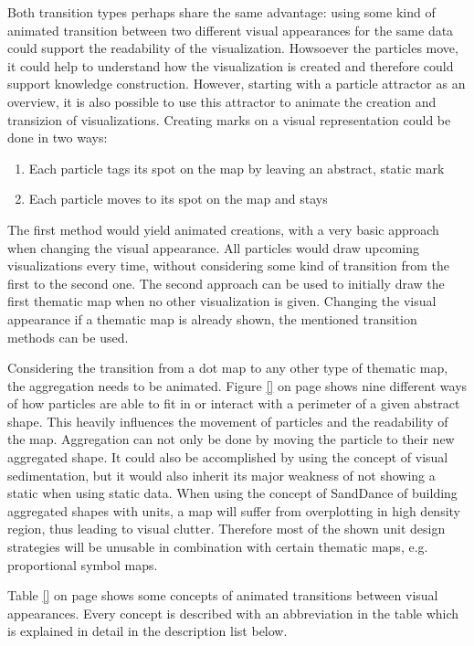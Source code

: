 Both transition types perhaps share the same advantage: using some kind of animated transition between two different visual appearances for the same data could support the readability of the visualization. Howsoever the particles move, it could help to understand how the visualization is created and therefore could support knowledge construction.
However, starting with a particle attractor as an overview, it is also possible to use this attractor to animate the creation and transizion of visualizations. Creating marks on a visual representation could be done in two ways:

\begin{enumerate}
\item Each particle tags its spot on the map by leaving an abstract, static mark
\item Each particle moves to its spot on the map and stays
\end{enumerate}

The first method would yield animated creations, with a very basic approach when changing the visual appearance. All particles would draw upcoming visualizations every time, without considering some kind of transition from the first to the second one. The second approach can be used to initially draw the first thematic map when no other visualization is given. Changing the visual appearance if a thematic map is already shown, the mentioned transition methods can be used.

Considering the transition from a dot map to any other type of thematic map, the aggregation needs to be animated. Figure \ref{} on page \pageref{} shows nine different ways of how particles are able to fit in or interact with a perimeter of a given abstract shape. This heavily influences the movement of particles and the readability of the map. Aggregation can not only be done by moving the particle to their new aggregated shape. It could also be accomplished by using the concept of visual sedimentation, but it would also inherit its major weakness of not showing a static when using static data. When using the concept of SandDance of building aggregated shapes with units, a map will suffer from overplotting in high density region, thus leading to visual clutter. Therefore most of the shown unit design strategies will be unusable in combination with certain thematic maps, e.g. proportional symbol maps.

Table \ref{} on page \pagref{} shows some concepts of animated transitions between visual appearances. Every concept is described with an abbreviation in the table which is explained in detail in the description list below.


